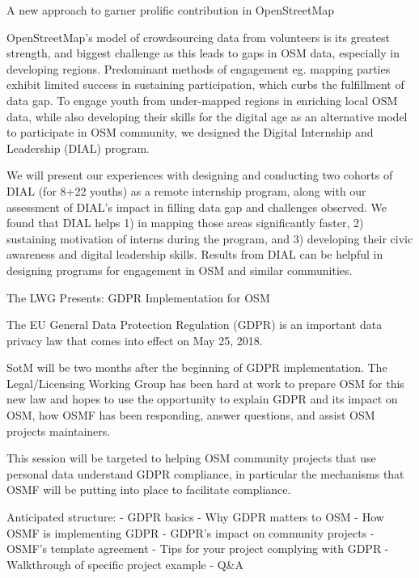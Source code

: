 %
{A new approach to garner prolific contribution in OpenStreetMap}%
{}%
{%
  OpenStreetMap's model of crowdsourcing data from volunteers is its greatest strength, and
  biggest challenge as this leads to gaps in OSM data, especially in developing regions. Predominant
  methods of engagement eg. mapping parties exhibit limited success in sustaining participation,
  which curbs the fulfillment of data gap. To engage youth from under-mapped regions in enriching
  local OSM data, while also developing their skills for the digital age as an alternative model to
  participate in OSM community, we designed the Digital Internship and Leadership (DIAL) program.

  We will present our experiences with designing and conducting two cohorts of DIAL (for 8+22 youths)
  as a remote internship program, along with our assessment of DIAL’s impact in filling data gap and
  challenges observed. We found that DIAL helps 1) in mapping those areas significantly faster, 2)
  sustaining motivation of interns during the program, and 3) developing their civic awareness and
  digital leadership skills. Results from DIAL can be helpful in designing programs for engagement in
  OSM and similar communities.%
}
%
{The LWG Presents: GDPR Implementation for OSM}%
{}%
{%
  The EU General Data Protection Regulation (GDPR) is an important data privacy law that comes into
  effect on May 25, 2018. 

  SotM will be two months after the beginning of GDPR implementation. The Legal/Licensing Working
  Group has been hard at work to prepare OSM for this new law and hopes to use the opportunity to
  explain GDPR and its impact on OSM, how OSMF has been responding, answer questions, and assist OSM
  projects maintainers. 
  
  This session will be targeted to helping OSM community projects that use personal data understand
  GDPR compliance, in particular the mechanisms that OSMF will be putting into place to facilitate
  compliance. 

  Anticipated structure:
   - GDPR basics
   - Why GDPR matters to OSM
   - How OSMF is implementing GDPR
   - GDPR's impact on community projects
   - OSMF's template agreement
   - Tips for your project complying with GDPR
   - Walkthrough of specific project example
   - Q\&A
%
}


